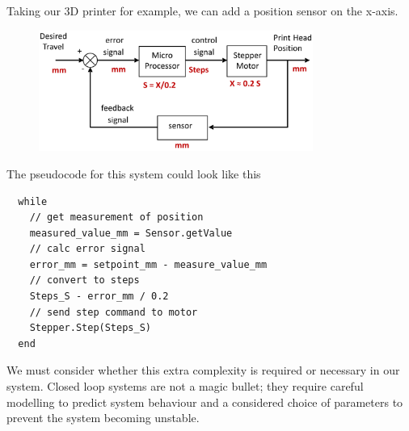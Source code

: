 \documentclass[class=report, crop=false, 12pt,a4paper]{standalone}
\begin{document}
Taking our 3D printer for example, we can add a position sensor on the x-axis.
\begin{figure}[H]
  \centering
  \includegraphics[width = 0.8\textwidth]{../img/controlstrat3dprinterclosed.png}
\end{figure}
The pseudocode for this system could look like this
\begin{verbatim}
  while
    // get measurement of position
    measured_value_mm = Sensor.getValue
    // calc error signal
    error_mm = setpoint_mm - measure_value_mm
    // convert to steps
    Steps_S - error_mm / 0.2
    // send step command to motor
    Stepper.Step(Steps_S)
  end
\end{verbatim}
We must consider whether this extra complexity is required or necessary in our system. Closed loop systems are not a magic bullet; they require careful modelling to predict system behaviour and a considered choice of parameters to prevent the system becoming unstable. 
\end{document}
